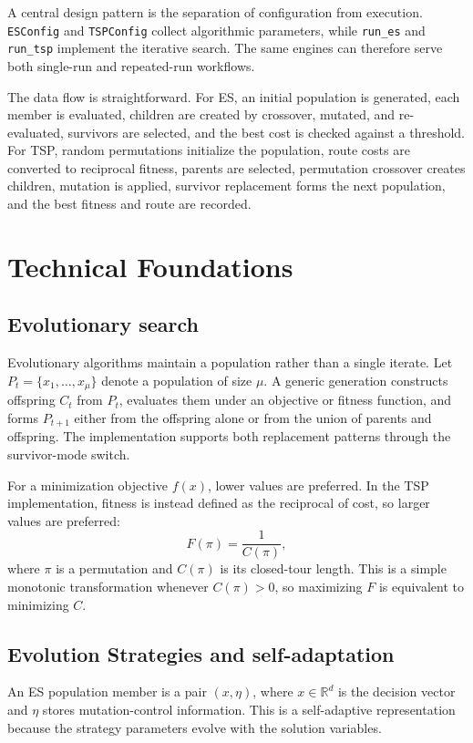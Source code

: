 \documentclass[11pt,a4paper]{article}
\newcommand{\code}[1]{\texttt{#1}}
\newcommand{\R}{\mathbb{R}}
\begin{document}
A central design pattern is the separation of configuration from execution. \code{ESConfig} and \code{TSPConfig} collect algorithmic parameters, while \code{run\_es} and \code{run\_tsp} implement the iterative search. The same engines can therefore serve both single-run and repeated-run workflows.

The data flow is straightforward. For ES, an initial population is generated, each member is evaluated, children are created by crossover, mutated, and re-evaluated, survivors are selected, and the best cost is checked against a threshold. For TSP, random permutations initialize the population, route costs are converted to reciprocal fitness, parents are selected, permutation crossover creates children, mutation is applied, survivor replacement forms the next population, and the best fitness and route are recorded.

\section{Technical Foundations}
\subsection{Evolutionary search}
Evolutionary algorithms maintain a population rather than a single iterate. Let $P_t=\{x_1,\ldots,x_\mu\}$ denote a population of size $\mu$. A generic generation constructs offspring $C_t$ from $P_t$, evaluates them under an objective or fitness function, and forms $P_{t+1}$ either from the offspring alone or from the union of parents and offspring. The implementation supports both replacement patterns through the survivor-mode switch.

For a minimization objective $f(x)$, lower values are preferred. In the TSP implementation, fitness is instead defined as the reciprocal of cost, so larger values are preferred:
\begin{equation}
F(\pi)=\frac{1}{C(\pi)},
\end{equation}
where $\pi$ is a permutation and $C(\pi)$ is its closed-tour length. This is a simple monotonic transformation whenever $C(\pi)>0$, so maximizing $F$ is equivalent to minimizing $C$.

\subsection{Evolution Strategies and self-adaptation}
An ES population member is a pair $(x,\eta)$, where $x\in\R^d$ is the decision vector and $\eta$ stores mutation-control information. This is a self-adaptive representation because the strategy parameters evolve with the solution variables.
\end{document}
